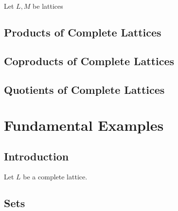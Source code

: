 \documentclass{book}
\begin{document}
	\begin{defn}
		 
		Let $L, M$ be lattices 
	\end{defn}
	
	\subsection{Products of Complete Lattices}
	
	
	\subsection{Coproducts of Complete Lattices}
	
	\subsection{Quotients of Complete Lattices}
	
	
	
	
	
	
	
	
	
	
	
	
	
	
	
	
	
	
	
	
	
	
	
	
	
	
	
	
	
	
	
	
	
	
	
	
	
	
	\newpage
	\section{Fundamental Examples}
	
	\subsection{Introduction}
	
	\begin{ex}
		Let $L$ be a complete lattice. 
	\end{ex}
	
	\subsection{Sets}
	
\end{document}
